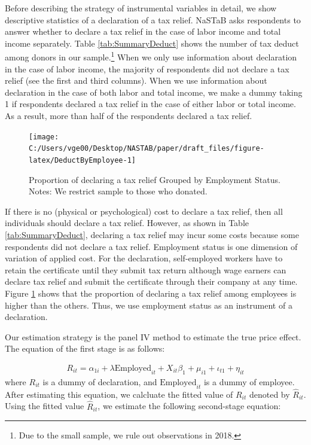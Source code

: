 \documentclass[
  11pt,
  a4paper,
]{article}
\begin{document}
Before describing the strategy of instrumental variables in detail,
we show descriptive statistics of a declaration of a tax relief.
NaSTaB asks respondents to answer whether to declare a tax relief
in the case of labor income and total income separately.
Table \ref{tab:SummaryDeduct} shows the number of tax deduct among donors in our sample.\footnote{Due to the small sample, we rule out observations in 2018.}
When we only use information about declaration in the case of labor income,
the majority of respondents did not declare a tax relief (see the first and third columns).
When we use information about declaration in the case of both labor and total income,
we make a dummy taking 1 if respondents declared a tax relief in the case of
either labor or total income.
As a result, more than half of the respondents declared a tax relief.

\begin{figure}[t]

{\centering \texttt{[image: C:/Users/vge00/Desktop/NASTAB/paper/draft\_files/figure-latex/DeductByEmployee-1]} 

}

\caption{Proportion of declaring a tax relief Grouped by Employment Status. Notes: We restrict sample to those who donated.}\label{fig:DeductByEmployee}
\end{figure}

If there is no (physical or psychological) cost to declare a tax relief,
then all individuals should declare a tax relief.
However, as shown in Table \ref{tab:SummaryDeduct},
declaring a tax relief may incur some costs because some respondents did not declare a tax relief.
Employment status is one dimension of variation of applied cost.
For the declaration, self-employed workers have to retain the certificate until they submit tax return although wage earners can declare tax relief and submit the certificate through their company at any time.
Figure \ref{fig:DeductByEmployee} shows that
the proportion of declaring a tax relief among employees is higher than the others.
Thus, we use employment status as an instrument of a declaration.

Our estimation strategy is the panel IV method to estimate the true price effect.
The equation of the first stage is as follows:

\begin{align}
  R_{it}
  = \alpha_{1i} + \lambda \text{Employed}_{it} + X_{it} \beta_1
  + \mu_{i1} + \iota_{t1} + \eta_{it} \label{eq:stage1}
\end{align}
where \(R_{it}\) is a dummy of declaration, and \(\text{Employed}_{it}\) is a dummy of employee.
After estimating this equation, we calcluate the fitted value of \(R_{it}\) denoted by \(\hat{R}_{it}\).
Using the fitted value \(\hat{R}_{it}\), we estimate the following second-stage equation:
\end{document}
